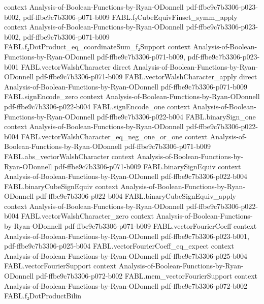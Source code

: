 \begin{theorem}
  {context}
  {Analysis-of-Boolean-Functions-by-Ryan-ODonnell}
  {pdf-ffbe9c7b3306-p023-b002,
    pdf-ffbe9c7b3306-p071-b009}
\proofstep
  {FABL.f₂CubeEquivFinset_symm_apply}
  {context}
  {Analysis-of-Boolean-Functions-by-Ryan-ODonnell}
  {pdf-ffbe9c7b3306-p023-b002,
    pdf-ffbe9c7b3306-p071-b009}
\proofstep
  {FABL.f₂DotProduct_eq_coordinateSum_f₂Support}
  {context}
  {Analysis-of-Boolean-Functions-by-Ryan-ODonnell}
  {pdf-ffbe9c7b3306-p071-b009,
    pdf-ffbe9c7b3306-p023-b001}
\proofstep
  {FABL.vectorWalshCharacter}
  {direct}
  {Analysis-of-Boolean-Functions-by-Ryan-ODonnell}
  {pdf-ffbe9c7b3306-p071-b009}
\proofstep
  {FABL.vectorWalshCharacter_apply}
  {direct}
  {Analysis-of-Boolean-Functions-by-Ryan-ODonnell}
  {pdf-ffbe9c7b3306-p071-b009}
\proofstep
  {FABL.signEncode_zero}
  {context}
  {Analysis-of-Boolean-Functions-by-Ryan-ODonnell}
  {pdf-ffbe9c7b3306-p022-b004}
\proofstep
  {FABL.signEncode_one}
  {context}
  {Analysis-of-Boolean-Functions-by-Ryan-ODonnell}
  {pdf-ffbe9c7b3306-p022-b004}
\proofstep
  {FABL.binarySign_one}
  {context}
  {Analysis-of-Boolean-Functions-by-Ryan-ODonnell}
  {pdf-ffbe9c7b3306-p022-b004}
\proofstep
  {FABL.vectorWalshCharacter_eq_neg_one_or_one}
  {context}
  {Analysis-of-Boolean-Functions-by-Ryan-ODonnell}
  {pdf-ffbe9c7b3306-p071-b009}
\proofstep
  {FABL.abs_vectorWalshCharacter}
  {context}
  {Analysis-of-Boolean-Functions-by-Ryan-ODonnell}
  {pdf-ffbe9c7b3306-p071-b009}
\proofstep
  {FABL.binarySignEquiv}
  {context}
  {Analysis-of-Boolean-Functions-by-Ryan-ODonnell}
  {pdf-ffbe9c7b3306-p022-b004}
\proofstep
  {FABL.binaryCubeSignEquiv}
  {context}
  {Analysis-of-Boolean-Functions-by-Ryan-ODonnell}
  {pdf-ffbe9c7b3306-p022-b004}
\proofstep
  {FABL.binaryCubeSignEquiv_apply}
  {context}
  {Analysis-of-Boolean-Functions-by-Ryan-ODonnell}
  {pdf-ffbe9c7b3306-p022-b004}
\proofstep
  {FABL.vectorWalshCharacter_zero}
  {context}
  {Analysis-of-Boolean-Functions-by-Ryan-ODonnell}
  {pdf-ffbe9c7b3306-p071-b009}
\proofstep
  {FABL.vectorFourierCoeff}
  {context}
  {Analysis-of-Boolean-Functions-by-Ryan-ODonnell}
  {pdf-ffbe9c7b3306-p023-b001,
    pdf-ffbe9c7b3306-p025-b004}
\proofstep
  {FABL.vectorFourierCoeff_eq_expect}
  {context}
  {Analysis-of-Boolean-Functions-by-Ryan-ODonnell}
  {pdf-ffbe9c7b3306-p025-b004}
\proofstep
  {FABL.vectorFourierSupport}
  {context}
  {Analysis-of-Boolean-Functions-by-Ryan-ODonnell}
  {pdf-ffbe9c7b3306-p072-b002}
\proofstep
  {FABL.mem_vectorFourierSupport}
  {context}
  {Analysis-of-Boolean-Functions-by-Ryan-ODonnell}
  {pdf-ffbe9c7b3306-p072-b002}
\proofstep
  {FABL.f₂DotProductBilin}

\end{theorem}

